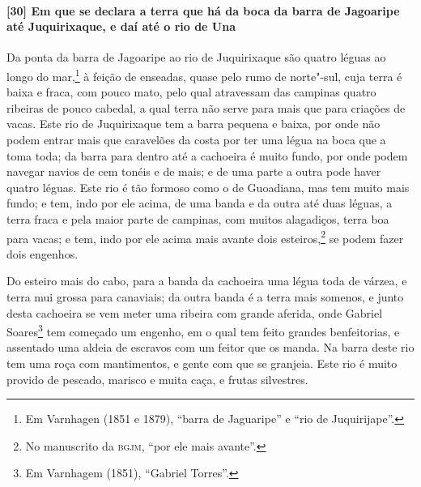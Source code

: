 \begin{linenumbers}
\paragraph{[30] Em que se declara a terra que há da boca da barra de Jagoaripe até
Juquirixaque, e daí até o rio de Una}\quad
Da ponta da barra de Jagoaripe ao rio de Juquirixaque são quatro léguas ao longo do
mar,\footnote{ Em Varnhagen (1851 e 1879), ``barra de Jaguaripe'' e ``rio de
Juquirijape''.} à feição de enseadas, quase pelo rumo de norte"-sul, cuja terra é baixa e
fraca, com pouco mato, pelo qual atravessam das campinas quatro ribeiras de pouco cabedal,
a qual terra não serve para mais que para criações de vacas. Este rio de Juquirixaque tem
a barra pequena e baixa, por onde não podem entrar mais que caravelões da costa por ter
uma légua na boca que a toma toda; da barra para dentro até a cachoeira é muito fundo, por
onde podem navegar navios de cem tonéis e de mais; e de uma parte a outra pode haver
quatro léguas. Este rio é tão formoso como o de Guoadiana, mas tem muito mais fundo; e
tem, indo por ele acima, de uma banda e da outra até duas léguas, a terra fraca e pela
maior parte de campinas, com muitos alagadiços, terra boa para vacas; e tem, indo por ele
acima mais avante dois esteiros,\footnote{ No manuscrito da \textsc{bgjm}, ``por ele mais
avante''.} se podem fazer dois engenhos.

Do esteiro mais do cabo, para a banda da cachoeira uma légua toda de várzea, e terra mui
grossa para canaviais; da outra banda é a terra mais somenos, e junto desta cachoeira se
vem meter uma ribeira com grande aferida, onde Gabriel Soares\footnote{ Em Varnhagem
(1851), ``Gabriel Torres''.} tem começado um engenho, em o qual tem feito grandes
benfeitorias, e assentado uma aldeia de escravos com um feitor que os manda. Na barra
deste rio tem uma roça com mantimentos, e gente com que se granjeia. Este rio é muito
provido de pescado, marisco e muita caça, e frutas silvestres.


\end{linenumbers}
